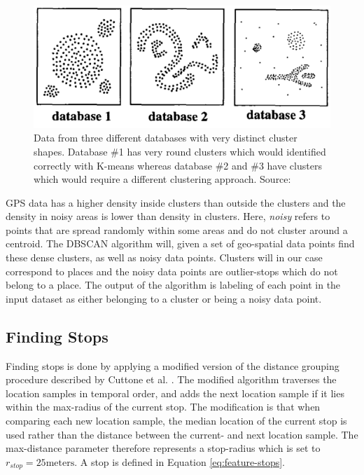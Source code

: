 \begin{figure}[h]
    \centering
    \includegraphics[width=\textwidth]{images/dbscan-clusters.png}
    \caption{Data from three different databases with very distinct cluster shapes. Database \#1 has very round clusters which would identified correctly with K-means whereas database \#2 and \#3 have clusters which would require a different clustering approach. Source: \cite{density-based-1996}}
    \label{fig:dbscan_shapes}
\end{figure}

GPS data has a higher density inside clusters than outside the clusters and the density in noisy areas is lower than density in clusters. Here, \textit{noisy} refers to points that are spread randomly within some areas and do not cluster around a centroid. The DBSCAN algorithm will, given a set of geo-spatial data points find these dense clusters, as well as noisy data points. Clusters will in our case correspond to places and the noisy data points are outlier-stops which do not belong to a place. The output of the algorithm is labeling of each point in the input dataset as either belonging to a cluster or being a noisy data point.

\subsection{Finding Stops}
Finding stops is done by applying a modified version of the distance grouping procedure described by Cuttone et al. \cite{sparse-location-2014}. The modified algorithm traverses the location samples in temporal order, and adds the next location sample if it lies within the max-radius of the current stop. The modification is that when comparing each new location sample, the median location of the current stop is used rather than the distance between the current- and next location sample. The max-distance parameter therefore represents a stop-radius which is set to $r_{stop} = 25 \text{meters}$.  A stop is defined in Equation \eqref{eq:feature-stops}.

